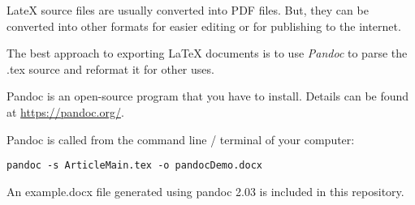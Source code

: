 LateX source files are usually converted into PDF files. But, they can be converted into other formats for easier editing or for publishing to the internet.

The best approach to exporting LaTeX documents is to use \emph{Pandoc} to parse the .tex source and reformat it for other uses.

Pandoc is an open-source program that you have to install. Details can be found at \href{https://pandoc.org/}{https://pandoc.org/}.

Pandoc is called from the command line / terminal of your computer:

\lstset{language = bash}
\begin{lstlisting}
pandoc -s ArticleMain.tex -o pandocDemo.docx
\end{lstlisting}


An example.docx file generated using pandoc 2.03 is included in this repository.